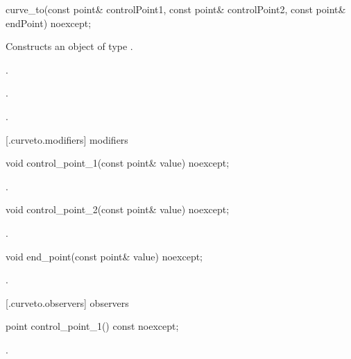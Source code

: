 \begin{itemdecl}
    curve_to(const point& controlPoint1, const point& controlPoint2,
      const point& endPoint) noexcept;
\end{itemdecl}
\begin{itemdescr}
	\pnum
	\effects
	Constructs an object of type .
	
	\pnum
	\postconditions
	.

	.

	.

\end{itemdescr}

 [\iotwod.curveto.modifiers]{ modifiers}

\begin{itemdecl}
    void control_point_1(const point& value) noexcept;
\end{itemdecl}
\begin{itemdescr}
	\pnum
	\postconditions
	.
	
\end{itemdescr}

\begin{itemdecl}
    void control_point_2(const point& value) noexcept;
\end{itemdecl}
\begin{itemdescr}
	\pnum
	\postconditions
	.
	
\end{itemdescr}

\begin{itemdecl}
    void end_point(const point& value) noexcept;
\end{itemdecl}
\begin{itemdescr}
	\pnum
	\postconditions
	.
	
\end{itemdescr}

 [\iotwod.curveto.observers]{ observers}

\begin{itemdecl}
    point control_point_1() const noexcept;
\end{itemdecl}
\begin{itemdescr}
	\pnum
	\returns
	.

\end{itemdescr}

